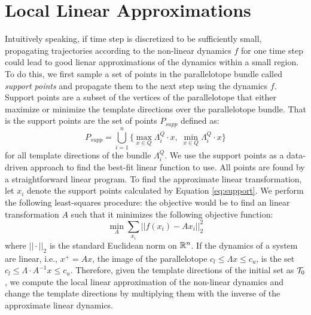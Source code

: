 \section{Local Linear Approximations}
\label{sec:lin_app}
%
Intuitively speaking, if time step is discretized to be sufficiently small, propagating trajectories according to the non-linear dynamics $f$ for one time step could lead to good lienar approximations of the dynamics within a small region.
%
%
To do this, we first sample a set of points in the parallelotope bundle called \emph{support points} and propagate them to the next step using the dynamics $f$.
%
Support points are a subset of the vertices of the parallelotope that either maximize or minimize the template directions over the parallelotope bundle.
%
That is the support points are the set of points $P_{supp}$ defined as:
\begin{equation}
\label{eq:support}
 P_{supp} = \bigcup_{i=1}^n \{ \max_{x \in Q} \Lambda^Q_i\cdot x, \; \min_{x \in Q} \Lambda^Q_i\cdot x \}
\end{equation}
%
for all template directions of the bundle $\Lambda^Q_i$. We use the support points as a data-driven approach to find the best-fit linear function to use. All points are found by a straightforward linear program.
%
%
To find the approximate linear transformation, let $x_i$ denote the support points calculated by Equation \ref{eq:support}. We perform the following least-squares procedure: the objective would be to find an linear transformation $A$ such that it minimizes the following objective function:
\begin{equation}
  \label{eq:least_squares}
  \min_{A} \sum_{x_i} ||f(x_i) - Ax_i||^2_2
\end{equation}
%
where $||\cdot||_2$ is the standard Euclidean norm on ${\mathbb{R}}^n$.
%
If the dynamics of a system are linear, i.e., $x^{+} = Ax$, the image of the parallelotope $c_{l} \leq \Lambda x \leq c_{u}$, is the set $c_{l} \leq \Lambda \cdot A^{-1} x \leq c_{u}$.
%
Therefore, given the template directions of the initial set as $\mathcal{T}_0$, we compute the local linear approximation of the non-linear dynamics and change the template directions by multiplying them with the inverse of the approximate linear dynamics.
%
%


